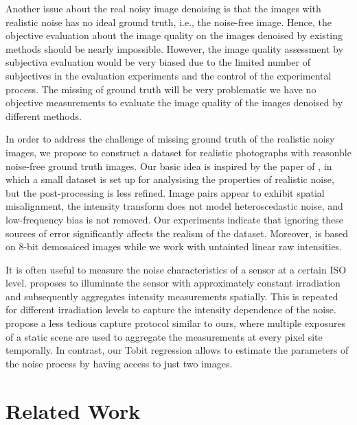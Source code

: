 Another issue about the real noisy image denoising is that the images with realistic noise has no ideal ground truth, i.e., the noise-free image. Hence, the objective evaluation about the image quality on the images denoised by existing methods should be nearly impossible. However, the image quality assessment by subjectiva evaluation would be very biased due to the limited number of subjectives in the evaluation experiments and the control of the experimental process. The missing of ground truth will be very problematic we have no objective measurements to evaluate the image quality of the images denoised by different methods. 

In order to address the challenge of missing ground truth of the realistic noisy images, we propose to construct a dataset for realistic photographs with reasonble noise-free ground truth images. Our basic idea is inspired by the paper of \cite{crosschannel}, in which a small dataset is set up for analysising the properties of realistic noise, but the post-processing is less refined. Image pairs appear to exhibit spatial misalignment, the intensity transform does not model heteroscedastic noise, and low-frequency bias is not removed. Our experiments
indicate that ignoring these sources of error significantly affects the realism of the dataset. Moreover, \cite{} is based on $8$-bit demosaiced images while we work with untainted linear raw intensities.

It is often useful to measure the noise characteristics of a sensor at a certain ISO level. \cite{} proposes to illuminate the sensor with approximately constant irradiation and subsequently aggregates intensity measurements spatially. This is repeated for different irradiation levels to capture the intensity dependence of the noise. \cite{} propose a less tedious capture protocol similar to ours, where multiple exposures of a static scene are used to aggregate the measurements at every pixel site temporally. In contrast, our Tobit regression allows to estimate the parameters of the noise process by having access to just two images.


\section{Related Work}

